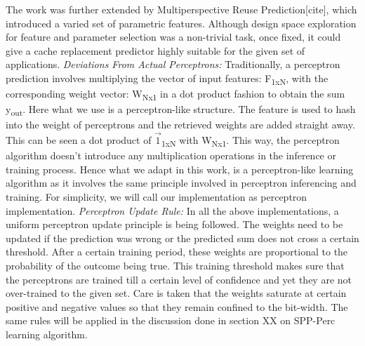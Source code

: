 \documentclass{sig-alternate}
\begin{document}
The work was further extended by Multiperspective Reuse Prediction[cite], which introduced a varied set of parametric features. 
Although design space exploration for feature and parameter selection was a non-trivial task, once fixed, it could give a cache replacement predictor highly suitable for the given set of applications.
\newline
\newline
\textit{Deviations From Actual Perceptrons:} Traditionally, a perceptron prediction involves multiplying the vector of input features: F\textsubscript{1xN}, with the corresponding weight vector: W\textsubscript{Nx1} in a dot product fashion to obtain the sum y\textsubscript{out}. 
Here what we use is a perceptron-like structure. 
The feature is used to hash into the weight of perceptrons and the retrieved weights are added straight away. 
This can be seen a dot product of $\vec{1}$\textsubscript{1xN} with W\textsubscript{Nx1}. 
This way, the perceptron algorithm doesn't introduce any multiplication operations in the inference or training process. 
Hence what we adapt in this work, is a perceptron-like learning algorithm as it involves the same principle involved in perceptron inferencing and training. 
For simplicity, we will call our implementation as perceptron implementation.
\newline
\newline
\textit{Perceptron Update Rule:} In all the above implementations, a uniform perceptron update principle is being followed. 
The weights need to be updated if the prediction was wrong or the predicted sum does not cross a certain threshold. 
After a certain training period, these weights are proportional to the probability of the outcome being true. 
This training threshold makes sure that the perceptrons are trained till a certain level of confidence and yet they are not over-trained to the given set. 
Care is taken that the weights saturate at certain positive and negative values so that they remain confined to the bit-width. 
The same rules will be applied in the discussion done in section XX on SPP-Perc learning algorithm.
\end{document}
